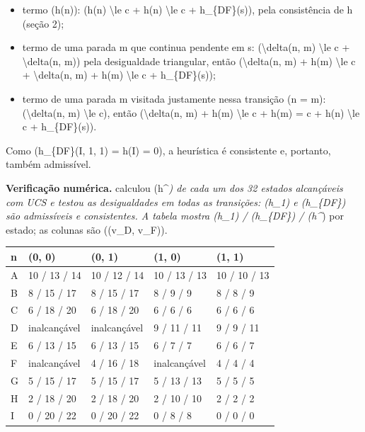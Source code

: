 \documentclass[12pt, a4paper]{article}
\providecommand{\tightlist}{%
  \setlength{\itemsep}{0pt}\setlength{\parskip}{0pt}}
\DeclareRobustCommand{\texttt}[1]{\breakabletexttt{#1}}
\begin{document}
\begin{itemize}
\tightlist
\item
  termo (h(n)): (h(n) \textbackslash le c + h(n\textquotesingle) \textbackslash le c + h\_\{DF\}(s\textquotesingle)), pela consistência de h (seção 2);
\item
  termo de uma parada m que continua pendente em s\textquotesingle: (\textbackslash delta(n, m) \textbackslash le c + \textbackslash delta(n\textquotesingle, m)) pela desigualdade triangular, então (\textbackslash delta(n, m) + h(m) \textbackslash le c + \textbackslash delta(n\textquotesingle, m) + h(m) \textbackslash le c + h\_\{DF\}(s\textquotesingle));
\item
  termo de uma parada m visitada justamente nessa transição (n\textquotesingle{} = m): (\textbackslash delta(n, m) \textbackslash le c), então (\textbackslash delta(n, m) + h(m) \textbackslash le c + h(m) = c + h(n\textquotesingle) \textbackslash le c + h\_\{DF\}(s\textquotesingle)).
\end{itemize}

Como (h\_\{DF\}(I, 1, 1) = h(I) = 0), a heurística é consistente e, portanto, também admissível.

\textbf{Verificação numérica.} \texttt{verificar\_heuristica} calculou (h\^{}\emph{) de cada um dos 32 estados alcançáveis com UCS e testou as desigualdades em todas as transições: (h\_1) e (h\_\{DF\}) são admissíveis e consistentes. A tabela mostra (h\_1) / (h\_\{DF\}) / (h\^{}}) por estado; as colunas são ((v\_D, v\_F)).

\begin{longtable}{@{}lllll@{}}
\toprule\noalign{}
n & (0, 0) & (0, 1) & (1, 0) & (1, 1) \\
\midrule\noalign{}
\endhead
\bottomrule\noalign{}
\endlastfoot
A & 10 / 13 / 14 & 10 / 12 / 14 & 10 / 13 / 13 & 10 / 10 / 13 \\
B & 8 / 15 / 17 & 8 / 15 / 17 & 8 / 9 / 9 & 8 / 8 / 9 \\
C & 6 / 18 / 20 & 6 / 18 / 20 & 6 / 6 / 6 & 6 / 6 / 6 \\
D & inal\-can\-çá\-vel & inal\-can\-çá\-vel & 9 / 11 / 11 & 9 / 9 / 11 \\
E & 6 / 13 / 15 & 6 / 13 / 15 & 6 / 7 / 7 & 6 / 6 / 7 \\
F & inal\-can\-çá\-vel & 4 / 16 / 18 & inal\-can\-çá\-vel & 4 / 4 / 4 \\
G & 5 / 15 / 17 & 5 / 15 / 17 & 5 / 13 / 13 & 5 / 5 / 5 \\
H & 2 / 18 / 20 & 2 / 18 / 20 & 2 / 10 / 10 & 2 / 2 / 2 \\
I & 0 / 20 / 22 & 0 / 20 / 22 & 0 / 8 / 8 & 0 / 0 / 0 \\
\end{longtable}
\end{document}
